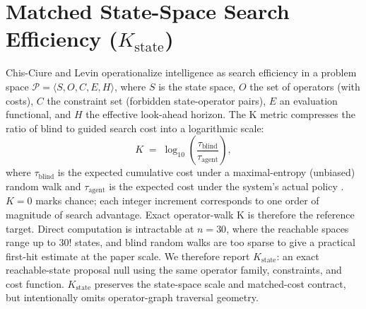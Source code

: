 \documentclass[11pt]{article}
\begin{document}
\section{Matched State-Space Search Efficiency ($K_{\mathrm{state}}$)}
\label{sec:k-computation}
Chis-Ciure and Levin \cite{chisciure2025cognition} operationalize intelligence as search efficiency
in a problem space $\mathcal{P} = \langle S, O, C, E, H \rangle$, where $S$ is the state space,
$O$ the set of operators (with costs), $C$ the constraint set (forbidden state-operator pairs),
$E$ an evaluation functional, and $H$ the effective look-ahead horizon.
The K metric compresses the ratio of blind to guided search cost into a logarithmic scale:
\[
K \;=\; \log_{10}\!\left(\frac{\tau_{\text{blind}}}{\tau_{\text{agent}}}\right),
\]
where $\tau_{\text{blind}}$ is the expected cumulative cost under a maximal-entropy (unbiased)
random walk and $\tau_{\text{agent}}$ is the expected cost under the system's actual policy
\cite{fields2022competency}.
$K = 0$ marks chance; each integer increment corresponds to one order of magnitude of search
advantage.
Exact operator-walk K is therefore the reference target. Direct computation is intractable at
$n=30$, where the reachable spaces range up to $30!$ states, and blind random walks are too sparse
to give a practical first-hit estimate at the paper scale. We therefore report
$K_{\mathrm{state}}$: an exact reachable-state proposal null using the same operator family,
constraints, and cost function. $K_{\mathrm{state}}$ preserves the state-space scale and
matched-cost contract, but intentionally omits operator-graph traversal geometry.
\end{document}
